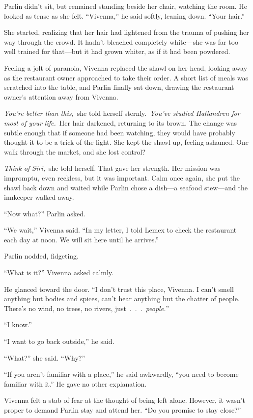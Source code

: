 Parlin didn’t sit, but remained standing beside her chair, watching the room. He looked as tense as she felt. “Vivenna,” he said softly, leaning down. “Your hair.”

She started, realizing that her hair had lightened from the trauma of pushing her way through the crowd. It hadn’t bleached completely white—she was far too well trained for that—but it had grown whiter, as if it had been powdered.

Feeling a jolt of paranoia, Vivenna replaced the shawl on her head, looking away as the restaurant owner approached to take their order. A short list of meals was scratched into the table, and Parlin finally sat down, drawing the restaurant owner’s attention away from Vivenna.

\textit{You’re better than this,}~she told herself sternly.~\textit{You’ve studied Hallandren for most of your life.}~Her hair darkened, returning to its brown. The change was subtle enough that if someone had been watching, they would have probably thought it to be a trick of the light. She kept the shawl up, feeling ashamed. One walk through the market, and she lost control?

\textit{Think of Siri,}~she told herself. That gave her strength. Her mission was impromptu, even reckless, but it was important. Calm once again, she put the shawl back down and waited while Parlin chose a dish—a seafood stew—and the innkeeper walked away.

“Now what?” Parlin asked.

“We wait,” Vivenna said. “In my letter, I told Lemex to check the restaurant each day at noon. We will sit here until he arrives.”

Parlin nodded, fidgeting.

“What is it?” Vivenna asked calmly.

He glanced toward the door. “I don’t trust this place, Vivenna. I can’t smell anything but bodies and spices, can’t hear anything but the chatter of people. There’s no wind, no trees, no rivers, just~.~.~.~\textit{people.}”

“I know.”

“I want to go back outside,” he said.

“What?” she said. “Why?”

“If you aren’t familiar with a place,” he said awkwardly, “you need to become familiar with it.” He gave no other explanation.

Vivenna felt a stab of fear at the thought of being left alone. However, it wasn’t proper to demand Parlin stay and attend her. “Do you promise to stay close?”

